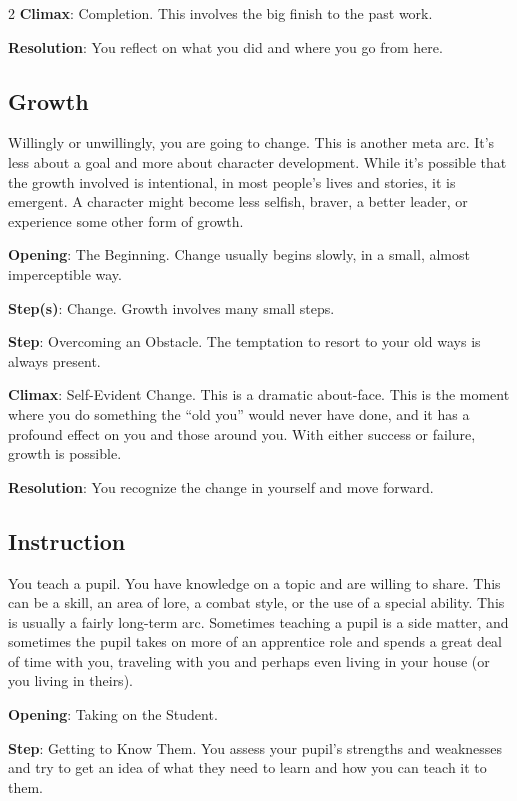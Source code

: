 \begin{multicols}{2}
\textbf{Climax}: Completion. This involves the big finish to the past work. 

\textbf{Resolution}: You reflect on what you did and where you go from here.

\subsection{Growth}

Willingly or unwillingly, you are going to change. This is another meta arc. It’s less about a goal and more about character development. While it’s possible that the growth involved is intentional, in most people’s lives and stories, it is emergent. A character might become less selfish, braver, a better leader, or experience some other form of growth.

\textbf{Opening}: The Beginning. Change usually begins slowly, in a small, almost imperceptible way.

\textbf{Step(s)}: Change. Growth involves many small steps. 

\textbf{Step}: Overcoming an Obstacle. The temptation to resort to your old ways is always present. 

\textbf{Climax}: Self-Evident Change. This is a dramatic about-face. This is the moment where you do something the “old you” would never have done, and it has a profound effect on you and those around you. With either success or failure, growth is possible.

\textbf{Resolution}: You recognize the change in yourself and move forward.

\subsection{Instruction}

You teach a pupil. You have knowledge on a topic and are willing to share. This can be a skill, an area of lore, a combat style, or the use of a special ability. This is usually a fairly long-term arc. Sometimes teaching a pupil is a side matter, and sometimes the pupil takes on more of an apprentice role and spends a great deal of time with you, traveling with you and perhaps even living in your house (or you living in theirs).

\textbf{Opening}: Taking on the Student.

\textbf{Step}: Getting to Know Them. You assess your pupil’s strengths and weaknesses and try to get an idea of what they need to learn and how you can teach it to them.


\end{multicols}
